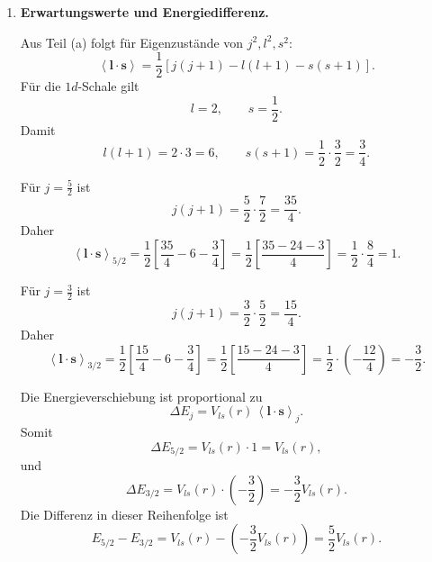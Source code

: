 \documentclass[11pt,a4paper]{scrartcl}
\newcommand{\avg}[1]{\left\langle #1 \right\rangle}
\newcommand{\paren}[1]{\left( #1 \right)}
\newcommand{\bracket}[1]{\left[ #1 \right]}
\newcommand{\vect}[1]{\bm{#1}}
\newcommand{\half}{\frac{1}{2}}
\theoremstyle{definition}
\theoremstyle{plain}
\theoremstyle{remark}
\begin{document}
\begin{enumerate}[label=(\alph*)]
    \begin{answerbox}
        Die $1d$-Schale besitzt $l=2$ und spaltet in
        \[
            \boxed{1d_{5/2}\quad\text{und}\quad 1d_{3/2}}
        \]
        auf.
    \end{answerbox}

    \item \textbf{Erwartungswerte und Energiedifferenz.}

    \begin{calculationbox}
        Aus Teil (a) folgt f\"ur Eigenzust\"ande von $j^2,l^2,s^2$:
        \[
            \avg{\vect{l}\cdot\vect{s}}
            =\half\bracket{j(j+1)-l(l+1)-s(s+1)}.
        \]
        F\"ur die $1d$-Schale gilt
        \[
            l=2,
            \qquad
            s=\half.
        \]
        Damit
        \[
            l(l+1)=2\cdot 3=6,
            \qquad
            s(s+1)=\half\cdot\frac{3}{2}=\frac{3}{4}.
        \]
    \end{calculationbox}

    \begin{calculationbox}[title=Unterschale $1d_{5/2}$]
        F\"ur $j=\frac{5}{2}$ ist
        \[
            j(j+1)=\frac{5}{2}\cdot\frac{7}{2}=\frac{35}{4}.
        \]
        Daher
        \[
            \avg{\vect{l}\cdot\vect{s}}_{5/2}
            =\half\bracket{\frac{35}{4}-6-\frac{3}{4}}
            =\half\bracket{\frac{35-24-3}{4}}
            =\half\cdot\frac{8}{4}
            =1.
        \]
    \end{calculationbox}

    \begin{calculationbox}[title=Unterschale $1d_{3/2}$]
        F\"ur $j=\frac{3}{2}$ ist
        \[
            j(j+1)=\frac{3}{2}\cdot\frac{5}{2}=\frac{15}{4}.
        \]
        Daher
        \[
            \avg{\vect{l}\cdot\vect{s}}_{3/2}
            =\half\bracket{\frac{15}{4}-6-\frac{3}{4}}
            =\half\bracket{\frac{15-24-3}{4}}
            =\half\cdot\paren{-\frac{12}{4}}
            =-\frac{3}{2}.
        \]
    \end{calculationbox}

    \begin{calculationbox}[title=Energieverschiebungen]
        Die Energieverschiebung ist proportional zu
        \[
            \Delta E_j = V_{ls}(r)\,\avg{\vect{l}\cdot\vect{s}}_j.
        \]
        Somit
        \[
            \Delta E_{5/2}=V_{ls}(r)\cdot 1=V_{ls}(r),
        \]
        und
        \[
            \Delta E_{3/2}=V_{ls}(r)\cdot\paren{-\frac{3}{2}}
            =-\frac{3}{2}V_{ls}(r).
        \]
        Die Differenz in dieser Reihenfolge ist
        \[
            E_{5/2}-E_{3/2}
            =V_{ls}(r)-\paren{-\frac{3}{2}V_{ls}(r)}
            =\frac{5}{2}V_{ls}(r).
        \]
    \end{calculationbox}


\end{enumerate}
\end{document}
